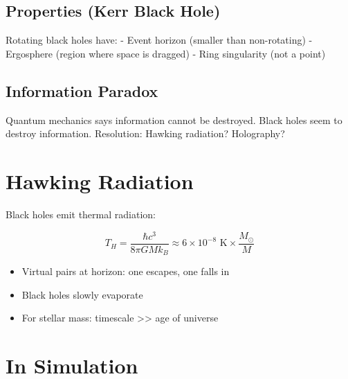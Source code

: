 \documentclass[
  11pt,
  letterpaper,
  twoside,
  openright]{book}
\providecommand{\tightlist}{%
  \setlength{\itemsep}{0pt}\setlength{\parskip}{0pt}}
\begin{document}
\subsection{Properties (Kerr Black
Hole)}\label{properties-kerr-black-hole}

Rotating black holes have: - Event horizon (smaller than non-rotating) -
Ergosphere (region where space is dragged) - Ring singularity (not a
point)

\subsection{Information Paradox}\label{information-paradox}

Quantum mechanics says information cannot be destroyed. Black holes seem
to destroy information. Resolution: Hawking radiation? Holography?

\section{Hawking Radiation}\label{hawking-radiation}

Black holes emit thermal radiation:

\[
T_H = \frac{\hbar c^3}{8\pi G M k_B} \approx 6 \times 10^{-8} \text{ K} \times \frac{M_\odot}{M}
\]

\begin{itemize}
\tightlist
\item
  Virtual pairs at horizon: one escapes, one falls in
\item
  Black holes slowly evaporate
\item
  For stellar mass: timescale \textgreater\textgreater{} age of universe
\end{itemize}

\section{In Simulation}\label{in-simulation-15}
\end{document}
